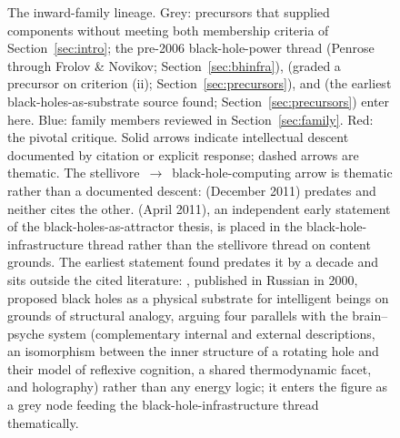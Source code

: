 \documentclass[11pt]{article}
\begin{document}
\begin{figure}[tbp]
{%
}
\caption{The inward-family lineage. Grey: precursors that supplied components without meeting both membership criteria of Section~\ref{sec:intro}; the pre-2006 black-hole-power thread (Penrose through Frolov \& Novikov; Section~\ref{sec:bhinfra}), \citet{Cirkovic2008} (graded a precursor on criterion (ii); Section~\ref{sec:precursors}), and \citet{Lefebvre2000} (the earliest black-holes-as-substrate source found; Section~\ref{sec:precursors}) enter here. Blue: family members reviewed in Section~\ref{sec:family}. Red: the pivotal critique. Solid arrows indicate intellectual descent documented by citation or explicit response; dashed arrows are thematic. The stellivore~$\to$~black-hole-computing arrow is thematic rather than a documented descent: \citet{Inoue2011} (December 2011) predates \citet{Vidal2014} and neither cites the other. \citet{Vidal2011} (April 2011), an independent early statement of the black-holes-as-attractor thesis, is placed in the black-hole-infrastructure thread rather than the stellivore thread on content grounds. The earliest statement found predates it by a decade and sits outside the cited literature: \citet{Lefebvre2000}, published in Russian in 2000, proposed black holes as a physical substrate for intelligent beings on grounds of structural analogy, arguing four parallels with the brain--psyche system (complementary internal and external descriptions, an isomorphism between the inner structure of a rotating hole and their model of reflexive cognition, a shared thermodynamic facet, and holography) rather than any energy logic; it enters the figure as a grey node feeding the black-hole-infrastructure thread thematically.}
\label{fig:tree}
\end{figure}
\end{document}
